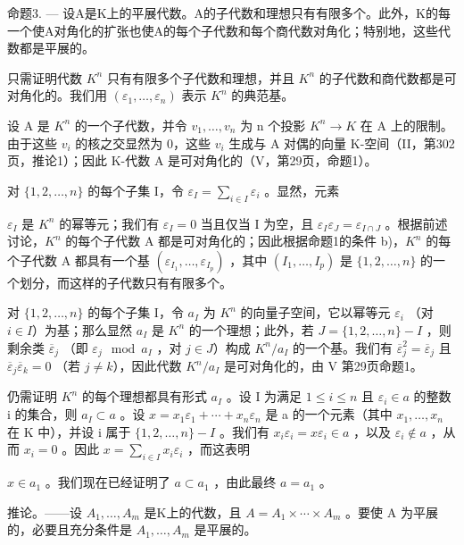 命题3. --- 设A是K上的平展代数。A的子代数和理想只有有限多个。此外，K的每一个使A对角化的扩张也使A的每个子代数和每个商代数对角化；特别地，这些代数都是平展的。

只需证明代数 \(K^{n}\) 只有有限多个子代数和理想，并且 \(K^{n}\) 的子代数和商代数都是可对角化的。我们用 \((\varepsilon_{1},\ldots,\varepsilon_{n})\) 表示 \(K^{n}\) 的典范基。

设 A 是 \(K^{n}\) 的一个子代数，并令 \(v_{1}, \ldots, v_{n}\) 为 n 个投影 \(K^{n} \rightarrow K\) 在 A 上的限制。由于这些 \(v_{i}\) 的核之交显然为 0，这些 \(v_{i}\) 生成与 A 对偶的向量 K-空间（II，第302页，推论1）；因此 K-代数 A 是可对角化的（V，第29页，命题1）。

对 \(\{1, 2, \ldots, n\}\) 的每个子集 I，令 \(\varepsilon_{I} = \sum_{i \in I} \varepsilon_{i}\) 。显然，元素

\(\varepsilon_{I}\) 是 \(K^{n}\) 的幂等元；我们有 \(\varepsilon_{I}=0\) 当且仅当 I 为空，且 \(\varepsilon_{I}\varepsilon_{J}=\varepsilon_{I\cap J}\) 。根据前述讨论，\(K^{n}\) 的每个子代数 A 都是可对角化的；因此根据命题1的条件 b)，\(K^{n}\) 的每个子代数 A 都具有一个基 \((\varepsilon_{I_{1}},\ldots,\varepsilon_{I_{p}})\) ，其中 \((I_{1},\ldots,I_{p})\) 是 \(\{1,2,\ldots,n\}\) 的一个划分，而这样的子代数只有有限多个。

对 \(\{1,2,\ldots,n\}\) 的每个子集 I，令 \(a_{I}\) 为 \(K^{n}\) 的向量子空间，它以幂等元 \(\varepsilon_{i}\) （对 \(i\in I\)）为基；那么显然 \(a_{I}\) 是 \(K^{n}\) 的一个理想；此外，若 \(J=\{1,2,\ldots,n\}-I\) ，则剩余类 \(\overline{\varepsilon}_{j}\) （即 \(\varepsilon_{j} \mod a_{I}\) ，对 \(j\in J\)）构成 \(K^{n}/a_{I}\) 的一个基。我们有 \(\overline{\varepsilon}_{j}^{2}=\overline{\varepsilon}_{j}\) 且 \(\overline{\varepsilon}_{j}\overline{\varepsilon}_{k}=0\) （若 \(j\neq k\)），因此代数 \(K^{n}/a_{I}\) 是可对角化的，由 V 第29页命题1。

仍需证明 \(K^{n}\) 的每个理想都具有形式 \(a_{I}\) 。设 I 为满足 \(1 \leqslant i \leqslant n\) 且 \(\varepsilon_{i} \in a\) 的整数 i 的集合，则 \(a_{I} \subset a\) 。设 \(x = x_{1}\varepsilon_{1} + \cdots + x_{n}\varepsilon_{n}\) 是 a 的一个元素（其中 \(x_{1}, \ldots, x_{n}\) 在 K 中），并设 i 属于 \(\{1, 2, \ldots, n\} - I\) 。我们有 \(x_{i}\varepsilon_{i} = x\varepsilon_{i} \in a\) ，以及 \(\varepsilon_{i} \notin a\) ，从而 \(x_{i} = 0\) 。因此 \(x = \sum_{i \in I} x_{i}\varepsilon_{i}\) ，而这表明

\(x \in a_{1}\) 。我们现在已经证明了 \(a \subset a_{1}\) ，由此最终 \(a = a_{1}\) 。

推论。——设 \(A_{1}, \ldots, A_{m}\) 是K上的代数，且 \(A = A_{1} \times \cdots \times A_{m}\) 。要使 A 为平展的，必要且充分条件是 \(A_{1}, \ldots, A_{m}\) 是平展的。

